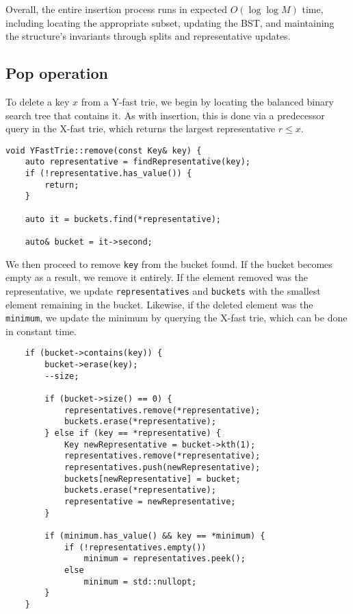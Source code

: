 Overall, the entire insertion process runs in expected \( O(\log \log M) \) time, including locating the appropriate subset, updating the BST, and maintaining the structure's invariants through splits and representative updates.

\subsection{Pop operation}

To delete a key \( x \) from a Y-fast trie, we begin by locating the balanced binary search tree that contains it. As with insertion, this is done via a predecessor query in the X-fast trie, which returns the largest representative \( r \leq x \).

\begin{verbatim}
void YFastTrie::remove(const Key& key) {
    auto representative = findRepresentative(key);
    if (!representative.has_value()) {
        return;
    }

    auto it = buckets.find(*representative);

    auto& bucket = it->second;
\end{verbatim}

We then proceed to remove \texttt{key} from the bucket found. If the bucket becomes empty as a result, we remove it entirely. If the element removed was the representative, we update \texttt{representatives} and \texttt{buckets} with the smallest element remaining in the bucket. Likewise, if the deleted element was the \texttt{minimum}, we update the minimum by querying the X-fast trie, which can be done in constant time.

\begin{verbatim}
    if (bucket->contains(key)) {
        bucket->erase(key);
        --size;

        if (bucket->size() == 0) {
            representatives.remove(*representative);
            buckets.erase(*representative);
        } else if (key == *representative) {
            Key newRepresentative = bucket->kth(1);
            representatives.remove(*representative);
            representatives.push(newRepresentative);
            buckets[newRepresentative] = bucket;
            buckets.erase(*representative);
            representative = newRepresentative;
        }

        if (minimum.has_value() && key == *minimum) {
            if (!representatives.empty())
                minimum = representatives.peek();
            else
                minimum = std::nullopt;
        }
    }
\end{verbatim}

